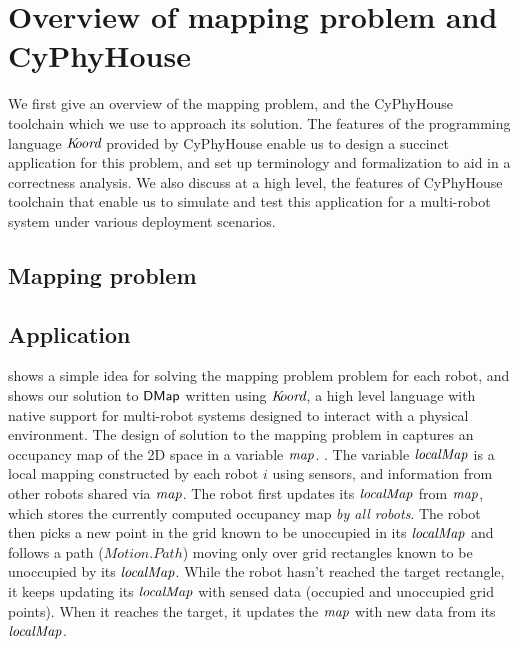 \section{Overview of mapping problem and CyPhyHouse}
\label{sec:overview}

We first give an overview of the mapping problem, and the CyPhyHouse toolchain which we use to approach its solution. The features of the programming language $\emph{K\kern-2pt oord}$ provided by CyPhyHouse enable us to design a succinct application for this problem, and set up terminology and formalization to aid in a correctness analysis. We also discuss at a high level, the features of CyPhyHouse toolchain that enable us to simulate and test this application for a multi-robot system under various deployment scenarios.

\subsection{Mapping problem }

\subsection{\dmap Application}

 shows a simple idea for solving the mapping problem problem for each robot, and  shows our solution to ${\sf DMap}$ written using $\emph{K\kern-2pt oord}$, a high level language with native support for multi-robot systems designed to interact with a physical environment. The design of solution to the mapping problem in  captures an occupancy map of the 2D space in a variable $\mathit{map}$. . The variable $\mathit{localMap}$ is a local mapping constructed by each robot $i$ using sensors, and information from other robots shared via $\mathit{map}$. The robot first updates its $\mathit{localMap}$ from $\mathit{map}$, which stores the currently computed occupancy map \emph{by all robots}.  The robot then picks a new point in the grid known to be unoccupied in its $\mathit{localMap}$ and follows a path ($\mathit{Motion.Path}$) moving only over grid rectangles known to be unoccupied by its $\mathit{localMap}$. While the robot hasn't reached the target rectangle, it keeps updating its $\mathit{localMap}$ with sensed data (occupied and unoccupied grid points). When it reaches the target, it updates the $\mathit{map}$ with new data from its $\mathit{localMap}$.



